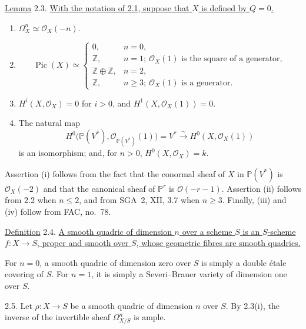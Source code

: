 
\underline{Lemma} 2.3. \underline{With the notation of 2.1, suppose that
$X$ is defined by $Q=0$.}

\begin{enumerate}[label=(\roman*),leftmargin=2.6em]
\item $\Omega_X^n\simeq\mathcal O_X(-n)$.

\item
\begin{equation*}
\operatorname{Pic}(X)\simeq
\begin{cases}
0, & n=0,\\
\mathbb Z, & n=1;\ \mathcal O_X(1)\text{ is the square of a generator},\\
\mathbb Z\oplus\mathbb Z, & n=2,\\
\mathbb Z, & n\geq 3;\ \mathcal O_X(1)\text{ is a generator}.
\end{cases}
\end{equation*}

\item $H^i(X,\mathcal O_X)=0$ for $i>0$, and
$H^1(X,\mathcal O_X(1))=0$.

\item The natural map
\begin{equation*}
H^0\bigl(\mathbb P(V^*),\mathcal O_{\mathbb P(V^*)}(1)\bigr)
=V^*\xrightarrow{\sim}H^0(X,\mathcal O_X(1))
\end{equation*}
is an isomorphism; and, for $n>0$,
$H^0(X,\mathcal O_X)=k$.
\end{enumerate}

Assertion (i) follows from the fact that the conormal sheaf of $X$ in
$\mathbb P(V^*)$ is $\mathcal O_X(-2)$ and that the canonical sheaf of
$\mathbb P^r$ is $\mathcal O(-r-1)$.  Assertion (ii) follows from 2.2
when $n\leq 2$, and from SGA~2, XII, 3.7 when $n\geq 3$.  Finally, (iii)
and (iv) follow from FAC, no.~78.

\underline{Definition} 2.4. \underline{A smooth quadric of dimension
$n$ over a scheme $S$ is an $S$-scheme $f:X\longrightarrow S$, proper
and smooth over $S$, whose geometric fibres are smooth quadrics.}

For $n=0$, a smooth quadric of dimension zero over $S$ is simply a
double \'{e}tale covering of $S$.  For $n=1$, it is simply a
Severi--Brauer variety of dimension one over $S$.

2.5. Let $\rho:X\longrightarrow S$ be a smooth quadric of dimension $n$
over $S$.  By 2.3(i), the inverse of the invertible sheaf
$\Omega^n_{X/S}$ is ample.


